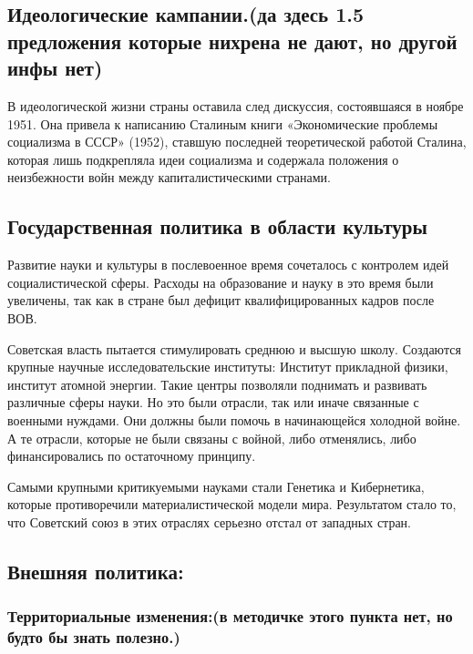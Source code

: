 \subsection{Идеологические кампании.(да здесь 1.5 предложения которые нихрена не дают, но другой инфы нет)}

В идеологической жизни страны оставила след дискуссия, состоявшаяся в ноябре 1951. Она привела к написанию Сталиным книги «Экономические проблемы социализма в СССР» (1952), ставшую последней теоретической работой Сталина, которая лишь подкрепляла идеи социализма и  содержала положения о неизбежности войн между капиталистическими странами.

\subsection{Государственная политика в области культуры}

Развитие науки и культуры в послевоенное время сочеталось с контролем идей социалистической сферы. Расходы на образование и науку в это время были увеличены, так как в стране был дефицит квалифицированных кадров после ВОВ. 

Советская власть пытается стимулировать среднюю и высшую школу. Создаются крупные научные исследовательские институты: Институт прикладной физики, институт атомной энергии. Такие центры позволяли поднимать и развивать различные сферы науки. Но это были отрасли, так или иначе связанные с военными нуждами. Они должны были помочь в начинающейся холодной войне. А те отрасли, которые не были связаны с войной, либо отменялись, либо финансировались по остаточному принципу. 

Самыми крупными критикуемыми науками стали Генетика и Кибернетика, которые противоречили материалистической модели мира. Результатом стало то, что Советский союз в этих отраслях серьезно отстал от западных стран.

\subsection{Внешняя политика:}

\subsubsection{\textbf{Территориальные изменения:(в методичке этого пункта нет, но будто бы знать полезно.)}}

